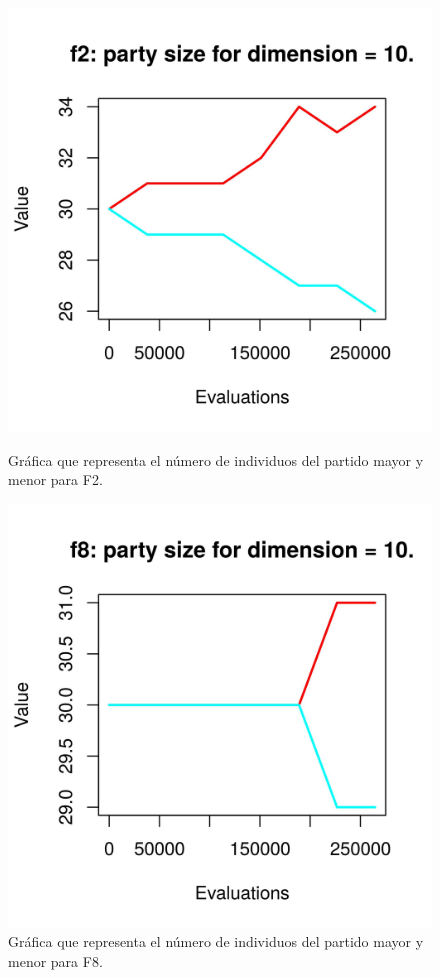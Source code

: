 \documentclass[11pt,a4paper]{article}
\begin{document}
		\begin{figure}[!h]
			\centering
			\begin{minipage}[b]{0.4\textwidth}
				\includegraphics[width=\textwidth]{Imagenes/f2_convergence_10.jpg}
				\caption{Gráfica que representa el número de individuos del partido mayor y menor para F2.}
			\end{minipage}
			\hfill
			\begin{minipage}[b]{0.4\textwidth}
				\includegraphics[width=\textwidth]{Imagenes/f8_convergence_10.jpg}
				\caption{Gráfica que representa el número de individuos del partido mayor y menor para F8.}
			\end{minipage}
		\end{figure}
		
\end{document}
